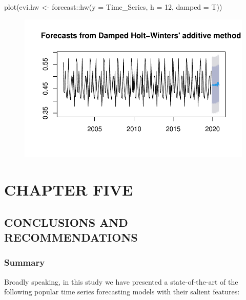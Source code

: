 \documentclass[
  onepage,
  openany]{scrbook}
\newenvironment{Shaded}{}{}
\newcommand{\AttributeTok}[1]{\textcolor[rgb]{0.49,0.56,0.16}{#1}}
\newcommand{\DecValTok}[1]{\textcolor[rgb]{0.25,0.63,0.44}{#1}}
\newcommand{\FunctionTok}[1]{\textcolor[rgb]{0.02,0.16,0.49}{#1}}
\newcommand{\NormalTok}[1]{#1}
\newcommand{\OtherTok}[1]{\textcolor[rgb]{0.00,0.44,0.13}{#1}}
\newcommand{\SpecialCharTok}[1]{\textcolor[rgb]{0.25,0.44,0.63}{#1}}
\begin{document}
\begin{Shaded}
\begin{Highlighting}[]
\FunctionTok{plot}\NormalTok{(evi.hw }\OtherTok{\textless{}{-}}\NormalTok{ forecast}\SpecialCharTok{::}\FunctionTok{hw}\NormalTok{(}\AttributeTok{y =}\NormalTok{ Time\_Series, }\AttributeTok{h =} \DecValTok{12}\NormalTok{, }\AttributeTok{damped =}\NormalTok{ T))}
\end{Highlighting}
\end{Shaded}

\begin{figure}[H]

{\centering \includegraphics{Quarto_files/figure-pdf/unnamed-chunk-15-1.pdf}

}

\end{figure}

\hypertarget{chapter-five}{%
\chapter{CHAPTER FIVE}\label{chapter-five}}

\hypertarget{conclusions-and-recommendations}{%
\section{CONCLUSIONS AND
RECOMMENDATIONS}\label{conclusions-and-recommendations}}

\hypertarget{summary}{%
\subsection{Summary}\label{summary}}

Broadly speaking, in this study we have presented a state-of-the-art of
the following popular time series forecasting models with their salient
features:
\end{document}
